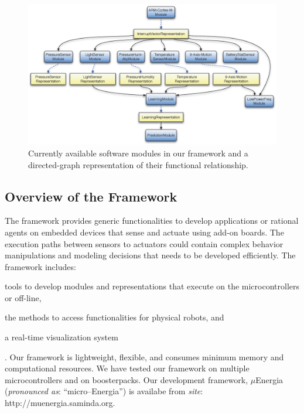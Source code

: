 \documentclass{IEEEtran}
\begin{document}
\begin{figure}[!t]
\centering
\includegraphics[width=\textwidth]{figures/graph_structure_def-crop3.eps}
\caption{Currently available software modules in our framework and a directed-graph representation of their functional relationship.}
 \label{fig:framework}
\end{figure}

\subsection{Overview of the Framework}
\label{sec:OverviewOfTheFramework}

\par
The framework provides generic functionalities to develop applications or rational agents 
on embedded devices that sense and actuate using add-on boards. The execution paths between sensors 
to actuators could contain complex behavior manipulations and modeling decisions that needs to be 
developed efficiently.
The framework 
includes: \begin{inparaenum}[($i$)] \item tools to develop modules and representations that execute on 
the microcontrollers or off-line, \item the methods to access functionalities for physical robots, 
and \item a real-time visualization system\end{inparaenum}. Our framework is lightweight, flexible, 
and consumes minimum memory and computational resources. We have tested our framework on multiple 
microcontrollers and on boosterpacks. 
Our development framework, $\mu$Energia (\textit{pronounced as}: ``micro--Energia'') is availabe from
\textit{site}:
{http://muenergia.saminda.org}.
\end{document}
